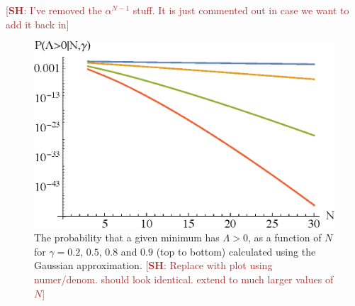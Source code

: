 \documentclass[12pt]{article}
\newcommand{\SH}[1]{\textcolor{brown}{[{\bf SH}: #1]}}
\begin{document}



\SH{I've removed the $\alpha^{N-1}$ stuff. It is just commented out in case we want to add it back in}



\begin{figure} 
  \centering
  \includegraphics[width=.6 \linewidth]{pwithN.eps}
  \caption{The probability that a given minimum has $\Lambda>0$, as a function of $N$ for $\gamma=0.2$, $0.5$, $0.8$ and $0.9$ (top to bottom) calculated using the Gaussian approximation. \SH{Replace with plot using numer/denom. should look identical. extend to much larger values of $N$}}
  \label{PVaryingWithNGaussian}
\end{figure}
  
\end{document}
